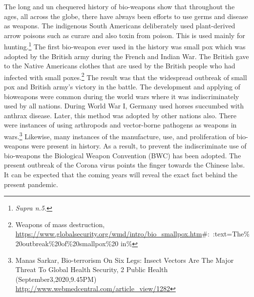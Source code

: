 \begin{multicols}{2}
\noi
The long and un chequered history of bio-weapons show that throughout the ages, all across
the globe, there have always been efforts to use germs and disease as weapons. The
indigenous South Americans deliberately used plant-derived arrow poisons such as curare
and also toxin from poison. This is used mainly for hunting.\footnote{\textit{Supra n.5.}} The first bio-weapon ever used
in the history was small pox which was adopted by the British army during the French and
Indian War. The British gave to the Native Americans clothes that are used by the British
people who had infected with small poxes.\footnote{Weapons of mass destruction,
\\\url{https://www.globalsecurity.org/wmd/intro/bio_smallpox.htm}\#:~:text=The\%20outbreak\%20of\%20smallpox\%20 in\%} The result was that the widespread outbreak of
small pox and British army’s victory in the battle. The development and applying of bioweapons were common during the world wars where it was indiscriminately used by all
nations. During World War I, Germany used horses succumbed with anthrax disease. Later,
this method was adopted by other nations also. There were instances of using arthropods and 
vector-borne pathogens as weapons in wars.\footnote{Manas Sarkar, Bio-terrorism On Six Legs: Insect Vectors Are The Major Threat To Global Health Security, 2 Public Health (September3,2020,9.45PM) \url{http://www.webmedcentral.com/article_view/1282}} Likewise, many instances of the manufacture,
use, and proliferation of bio-weapons were present in history. As a result, to prevent the
indiscriminate use of bio-weapons the Biological Weapon Convention (BWC) has been
adopted. The present outbreak of the Corona virus points the finger towards the Chinese labs.
It can be expected that the coming years will reveal the exact fact behind the present
pandemic.

\vspace{.5cm}


\end{multicols}
